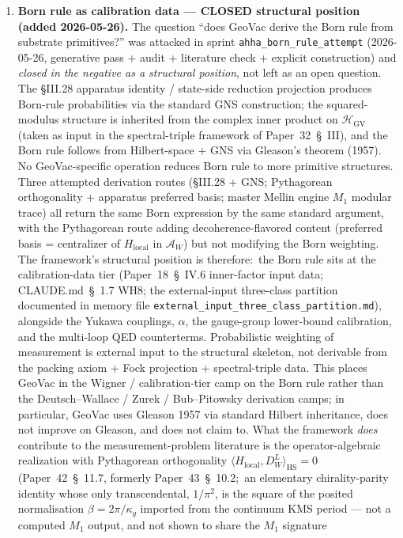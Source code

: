 \documentclass[11pt]{article}
\begin{document}
\begin{enumerate}
\item \textbf{Born rule as calibration data --- CLOSED structural
position (added 2026-05-26).}  The question ``does GeoVac derive
the Born rule from substrate primitives?'' was attacked in sprint
\texttt{ahha\_born\_rule\_attempt} (2026-05-26, generative pass +
audit + literature check + explicit construction) and \emph{closed
in the negative as a structural position}, not left as an open
question.  The §III.28 apparatus identity / state-side reduction
projection produces Born-rule probabilities via the standard GNS
construction; the squared-modulus structure is inherited from the
complex inner product on $\mathcal{H}_{\mathrm{GV}}$ (taken as input
in the spectral-triple framework of Paper~32~\S~III), and the Born
rule follows from Hilbert-space + GNS via Gleason's theorem (1957).
No GeoVac-specific operation reduces Born rule to more primitive
structures.  Three attempted derivation routes (§III.28 + GNS;
Pythagorean orthogonality + apparatus preferred basis; master Mellin
engine $M_1$ modular trace) all return the same Born expression by
the same standard argument, with the Pythagorean route adding
decoherence-flavored content (preferred basis = centralizer of
$H_{\mathrm{local}}$ in $\mathcal{A}_W$) but not modifying the Born
weighting.  The framework's structural position is therefore:\ the
Born rule sits at the calibration-data tier (Paper~18~\S~IV.6
inner-factor input data; CLAUDE.md~\S~1.7 WH8; the
external-input three-class partition documented in memory file
\texttt{external\_input\_three\_class\_partition.md}), alongside the
Yukawa couplings, $\alpha$, the gauge-group lower-bound calibration,
and the multi-loop QED counterterms.  Probabilistic weighting of
measurement is external input to the structural skeleton, not
derivable from the packing axiom + Fock projection + spectral-triple
data.  This places GeoVac in the Wigner / calibration-tier camp on
the Born rule rather than the Deutsch--Wallace / Zurek /
Bub--Pitowsky derivation camps; in particular, GeoVac uses Gleason
1957 via standard Hilbert inheritance, does not improve on Gleason,
and does not claim to.  What the framework \emph{does} contribute to
the measurement-problem literature is the operator-algebraic
realization with Pythagorean orthogonality
$\langle H_{\mathrm{local}}, D_W^L\rangle_{\mathrm{HS}} = 0$
(Paper~42~\S~11.7, formerly Paper~43~\S~10.2;\ an elementary chirality-parity identity whose only
transcendental, $1/\pi^2$, is the square of the posited normalisation
$\beta = 2\pi/\kappa_g$ imported from the continuum KMS period ---
not a computed $M_1$ output, and not shown to share the $M_1$ signature

\end{enumerate}
\end{document}
